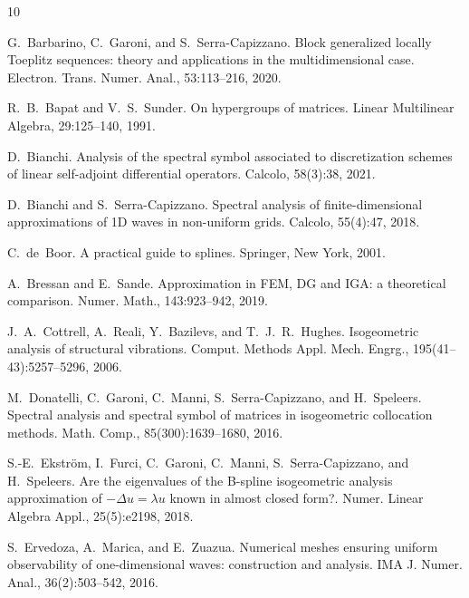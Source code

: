 \documentclass[11pt]{article}
\begin{document}
\begin{thebibliography}{10}


G.~Barbarino, C.~Garoni, and S.~Serra-Capizzano.
\newblock Block generalized locally {Toeplitz} sequences: theory and applications in the multidimensional case.
\newblock Electron. Trans. Numer. Anal., 53:113--216, 2020.


R.~B.~Bapat and V.~S.~Sunder.
\newblock On hypergroups of matrices.
\newblock Linear Multilinear Algebra, 29:125--140, 1991.

D.~Bianchi.
\newblock Analysis of the spectral symbol associated to discretization schemes of linear self-adjoint differential operators.
\newblock Calcolo, 58(3):38, 2021.


D.~Bianchi and S.~Serra-Capizzano.
\newblock Spectral analysis of finite-dimensional approximations of 1D waves in non-uniform grids.
\newblock Calcolo, 55(4):47, 2018.

C.~de~Boor.
\newblock A practical guide to splines.
\newblock Springer, New York, 2001.

A.~Bressan and E.~Sande.
\newblock Approximation in {FEM}, {DG} and {IGA}: a theoretical comparison.
\newblock Numer. Math., 143:923--942, 2019.

J.~A.~Cottrell, A.~Reali, Y.~Bazilevs, and T.~J.~R.~Hughes.
\newblock Isogeometric analysis of structural vibrations.
\newblock Comput. Methods Appl. Mech. Engrg., 195(41--43):5257--5296, 2006.


M.~Donatelli, C.~Garoni, C.~Manni, S.~Serra-Capizzano, and H.~Speleers.
\newblock Spectral analysis and spectral symbol of matrices in isogeometric collocation methods.
\newblock Math. Comp., 85(300):1639--1680, 2016.



S.-E.~Ekstr{\"o}m, I.~Furci, C.~Garoni, C.~Manni, S.~Serra-Capizzano, and H.~Speleers.
\newblock Are the eigenvalues of the {B}-spline isogeometric analysis approximation of $-\Delta u=\lambda u$ known in almost closed form?.
\newblock Numer. Linear Algebra Appl., 25(5):e2198, 2018.

S.~Ervedoza, A.~Marica, and E.~Zuazua.
\newblock Numerical meshes ensuring uniform observability of one-dimensional waves: construction and analysis.
\newblock IMA J. Numer. Anal., 36(2):503--542, 2016.




\end{thebibliography}
\end{document}
